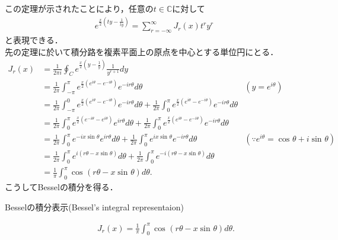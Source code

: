 \documentclass[a4j,papersize,disablejfam,slide,14pt]{jsarticle}
\def\sin#1#2{\operatorname{sin}^{#2} #1} %
\def\cos#1#2{\operatorname{cos}^{#2} #1} %
\def\exp#1{e^{#1}} %
\begin{document}
    この定理が示されたことにより，任意の$t \in \mathbb{C}$に対して
    \begin{align}
    	\exp{\frac{x}{2}\left( ty - \frac{1}{ty} \right)} = \sum_{r=-\infty}^{\infty} J_r(x)t^r y^r \label{eq:bessel_series}
    \end{align}
    と表現できる．\\
    先の定理に於いて積分路を複素平面上の原点を中心とする単位円にとる．
    \begin{align}
    	J_r(x) &= \frac{1}{2 \pi i}\oint_{C} \exp{\frac{x}{2}\left( y - \frac{1}{y} \right)} \frac{1}{y^{r+1}} dy \\
        &= \frac{1}{2 \pi}\int_{-\pi}^{\pi} \exp{\frac{x}{2} (\exp{i\theta} - \exp{-i\theta})} \exp{-ir\theta} d\theta & (y = \exp{i\theta}) \\
        &= \frac{1}{2 \pi} \int_{-\pi}^{0} \exp{\frac{x}{2} (\exp{i\theta} - \exp{-i\theta})} \exp{-ir\theta} d\theta
        	+ \frac{1}{2 \pi} \int_{0}^{\pi} \exp{\frac{x}{2} (\exp{i\theta} - \exp{-i\theta})} \exp{-ir\theta} d\theta \\
        &= \frac{1}{2 \pi} \int_{0}^{\pi} \exp{\frac{x}{2} (\exp{-i\theta} - \exp{i\theta})} \exp{ir\theta} d\theta 
        	+ \frac{1}{2 \pi} \int_{0}^{\pi} \exp{\frac{x}{2} (\exp{i\theta} - \exp{-i\theta})} \exp{-ir\theta} d\theta \\
        &= \frac{1}{2 \pi} \int_{0}^{\pi} \exp{-ix\sin{\theta}{}}\exp{ir\theta} d\theta 
        	+ \frac{1}{2 \pi} \int_{0}^{\pi} \exp{ix\sin{\theta}{}}\exp{-ir\theta} d\theta  & (\because \exp{i\theta} = \cos{\theta}{}+i\sin{\theta}{})\\
        &= \frac{1}{2 \pi} \int_{0}^{\pi} \exp{i(r\theta - x\sin{\theta}{})} d\theta 
        	+ \frac{1}{2 \pi} \int_{0}^{\pi} \exp{-i(r\theta - x\sin{\theta}{})} d\theta \\
        &= \frac{1}{\pi} \int_{0}^{\pi} \cos{(r\theta - x\sin{\theta}{})}{} d\theta.
    \end{align}
    こうして{\rm Bessel}の積分を得る．
    \begin{screen}
    	\begin{description}
        	\item[{\rm Bessel}の積分表示({\rm Bessel's integral representaion})]
            \begin{align}
            	J_r(x) = \frac{1}{\pi} \int_{0}^{\pi} \cos{(r\theta - x\sin{\theta}{})}{} d\theta. \label{eq:bessel_integral}
            \end{align}
        \end{description}
    \end{screen}
\end{document}
